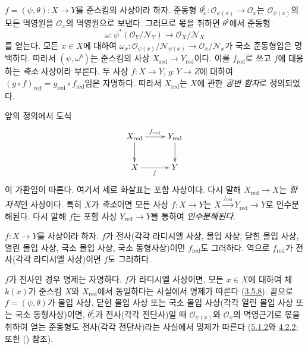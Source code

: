 \begin{env}[5.1.5]
\label{I.5.1.5-ko}
$f=(\psi,\theta):X\to Y$를 준스킴의 사상이라 하자. 준동형
$\theta_x^\sharp:\mathscr{O}_{\psi(x)}\to\mathscr{O}_x$는
$\mathscr{O}_{\psi(x)}$의 모든 멱영원을 $\mathscr{O}_x$의 멱영원으로
보낸다. 그러므로 몫을 취하면 $\theta^\sharp$에서 준동형
\[
  \omega:\psi^*(\mathscr{O}_Y/\mathscr{N}_Y)
  \longrightarrow \mathscr{O}_X/\mathscr{N}_X
\]
를 얻는다. 모든 $x\in X$에 대하여
$\omega_x:\mathscr{O}_{\psi(x)}/\mathscr{N}_{\psi(x)}
\to\mathscr{O}_x/\mathscr{N}_x$가 국소 준동형임은 명백하다. 따라서
$(\psi,\omega^b)$는 준스킴의 사상
$X_{\mathrm{red}}\to Y_{\mathrm{red}}$이다. 이를 $f_{\mathrm{red}}$로
쓰고 $f$에 대응하는 \emph{축소} 사상이라 부른다. 두 사상
$f:X\to Y$, $g:Y\to Z$에 대하여
$(g\circ f)_{\mathrm{red}}=g_{\mathrm{red}}\circ f_{\mathrm{red}}$임은
자명하다. 따라서 $X_{\mathrm{red}}$는 $X$에 관한 \emph{공변 함자}로
정의되었다.

앞의 정의에서 도식
\[
  \xymatrix{
    X_{\mathrm{red}}\ar[r]^{f_{\mathrm{red}}}\ar[d] &
    Y_{\mathrm{red}}\ar[d]\\
    X\ar[r]_f & Y
  }
\]
이 가환임이 따른다. 여기서 세로 화살표는 포함 사상이다. 다시 말해
$X_{\mathrm{red}}\to X$는 \emph{함자적}인 사상이다. 특히 $X$가
\emph{축소}이면 모든 사상 $f:X\to Y$는
$X\xrightarrow{f_{\mathrm{red}}}Y_{\mathrm{red}}\to Y$로
인수분해된다. 다시 말해 $f$는 포함 사상
$Y_{\mathrm{red}}\to Y$를 통하여 \emph{인수분해된다}.
\end{env}

\begin{proposition}[5.1.6]
\label{I.5.1.6-ko}
$f:X\to Y$를 사상이라 하자. $f$가 전사(각각 라디시엘 사상, 몰입
사상, 닫힌 몰입 사상, 열린 몰입 사상, 국소 몰입 사상, 국소
동형사상)이면 $f_{\mathrm{red}}$도 그러하다. 역으로
$f_{\mathrm{red}}$가 전사(각각 라디시엘 사상)이면 $f$도 그러하다.
\end{proposition}

$f$가 전사인 경우 명제는 자명하다. $f$가 라디시엘 사상이면, 모든
$x\in X$에 대하여 체 $k(x)$가 준스킴 $X$와 $X_{\mathrm{red}}$에서
동일하다는 사실에서 명제가 따른다
(\hyperref[I.3.5.8-ko]{3.5.8}). 끝으로 $f=(\psi,\theta)$가 몰입 사상,
닫힌 몰입 사상 또는 국소 몰입 사상(각각 열린 몰입 사상 또는 국소
동형사상)이면, $\theta_x^\sharp$가 전사(각각 전단사)일 때
$\mathscr{O}_{\psi(x)}$와 $\mathscr{O}_x$의 멱영근기로 몫을 취하여
얻는 준동형도 전사(각각 전단사)라는 사실에서 명제가 따른다
(\hyperref[I.5.1.2-ko]{5.1.2}와
\hyperref[I.4.2.2-ko]{4.2.2}; 또한
() 참조).

